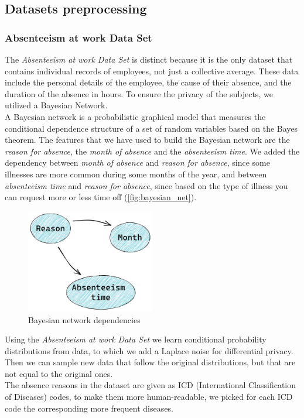 \subsection{Datasets preprocessing}
\subsubsection*{Absenteeism at work Data Set}
The \textit{Absenteeism at work Data Set} is distinct because it is the only dataset that contains individual records of employees, not just a collective average. These data include the personal details of the employee, the cause of their absence, and the duration of the absence in hours. To ensure the privacy of the subjects, we utilized a Bayesian Network. \\ 
A Bayesian network is a probabilistic graphical model that measures the conditional dependence structure of a set of random variables based on the Bayes theorem. The features that we have used to build the Bayesian network are the \textit{reason for absence}, the \textit{month of absence} and the \textit{absenteeism time}. We added the dependency between \textit{month of absence} and \textit{reason for absence}, since some illnesses are more common during some months of the year, and between \textit{absenteeism time} and \textit{reason for absence}, since based on the type of illness you can request more or less time off (\autoref{fig:bayesian_net}). \\
\begin{figure}[h] 
    \centering
    \includegraphics[width=0.5\textwidth]{images/bayesian_net.png}
    \caption{Bayesian network dependencies}
    \label{fig:bayesian_net}
  \end{figure}
Using the \textit{Absenteeism at work Data Set} we learn conditional probability distributions from data, to which we add a Laplace noise for differential privacy. Then we can sample new data that follow the original distributions, but that are not equal to the original ones. \\
The absence reasons in the dataset are given as ICD (International Classification of Diseases) codes, to make them more human-readable, we picked for each ICD code the corresponding more frequent diseases.
